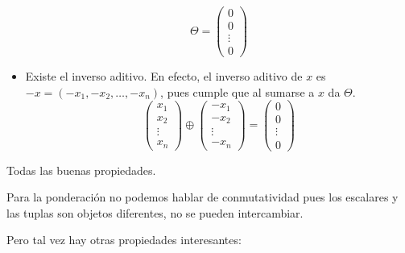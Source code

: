 \documentclass[12pt]{book}
\begin{document}
\begin{itemize}
$$ \Theta= \left(\begin{array}{c}0\\ 0\\ \vdots\\ 0\end{array}\right)$$
\item Existe el inverso aditivo. En efecto, el inverso aditivo de $x$ es $-x=(-x_1,-x_2,\dots,-x_n)$, pues cumple que al sumarse a $x$ da $\Theta$.
  $$ \left(\begin{array}{c}x_1\\ x_2\\ \vdots\\ x_n\end{array}\right)\oplus
  \left(\begin{array}{c}-x_1\\-x_2\\ \vdots\\ -x_n\end{array}\right)
    =\left(\begin{array}{c}0\\ 0\\ \vdots\\ 0\end{array}\right)$$
  
\end{itemize}

Todas las buenas propiedades.

Para la ponderación no podemos hablar de conmutatividad pues los escalares y las tuplas son objetos diferentes, no se pueden intercambiar.

Pero tal vez hay otras propiedades interesantes:
\end{document}
